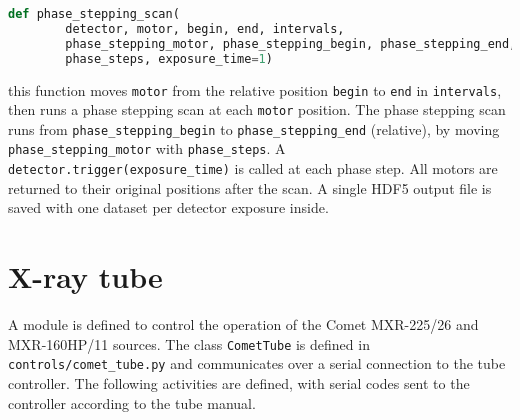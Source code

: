 \begin{lstlisting}[language=Python]
def phase_stepping_scan(
        detector, motor, begin, end, intervals,
        phase_stepping_motor, phase_stepping_begin, phase_stepping_end,
        phase_steps, exposure_time=1)
\end{lstlisting}
this function moves \texttt{motor} from the relative position \texttt{begin}
to \texttt{end} in \texttt{intervals}, then runs a phase stepping scan at
each \texttt{motor} position. The phase stepping scan runs from
\texttt{phase\_stepping\_begin} to
\texttt{phase\_stepping\_end} (relative), by moving
\texttt{phase\_stepping\_motor} with 
\texttt{phase\_steps}. A \texttt{detector.trigger(exposure\_time)} is called
at each phase step.
All motors are returned to their original positions after the scan.
A single HDF5 output file is saved with one dataset per detector exposure
inside.

\section{X-ray tube}
A module is defined to control the operation of the Comet MXR-225/26 and
MXR-160HP/11 sources. The class \texttt{CometTube} is defined in
\texttt{controls/comet\_tube.py} and communicates over a serial connection
to the tube controller.
The following activities are defined, with serial codes sent to the
controller according to the tube manual\cn.

